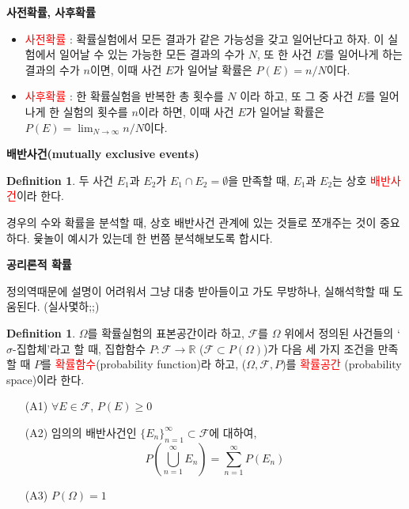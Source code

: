 \documentclass{article}
\theoremstyle{definition}
\newtheorem{definition}[theorem]{Definition}
\begin{document}
\noindent
\textbf{사전확률, 사후확률}

\begin{itemize}
    \item \textcolor{red}{사전확률} : 확률실험에서 모든 결과가 같은 가능성을 갖고 일어난다고 하자. 이 실험에서 일어날 수 있는 가능한 모든 결과의 수가 $N$, 또 한 사건 $E$를 일어나게 하는 결과의 수가 $n$이면, 이때 사건 $E$가 일어날 확률은 $P(E) = n/N$이다. 
    \item \textcolor{red}{사후확률} : 한 확률실험을 반복한 총 횟수를 $N$ 이라 하고, 또 그 중 사건 $E$를 일어나게 한 실험의 횟수를 $n$이라 하면, 이때 사건 $E$가 일어날 확률은 $P(E) = \lim_{N \rightarrow \infty} n/N$이다.
\end{itemize}

\noindent
\textbf{배반사건(mutually exclusive events)}

\begin{definition}
    두 사건 $E_1$과 $E_2$가 $E_1 \cap E_2 = \emptyset$을 만족할 때, $E_1$과 $E_2$는 상호 \textcolor{red}{배반사건}이라 한다.
\end{definition}

\noindent
경우의 수와 확률을 분석할 때, 상호 배반사건 관계에 있는 것들로 쪼개주는 것이 중요하다. 윷놀이 예시가 있는데 한 번쯤 분석해보도록 합시다.

\vspace{5mm}\noindent
\textbf{공리론적 확률}

\noindent
정의역때문에 설명이 어려워서 그냥 대충 받아들이고 가도 무방하나, 실해석학할 때 도움된다. (실사몇하;;)

\begin{definition}
    $\Omega$를 확률실험의 표본공간이라 하고, $\mathcal{F}$를 $\Omega$ 위에서 정의된 사건들의 `$\sigma$-집합체'라고 할 때, 집합함수 $P : \mathcal{F} \rightarrow \mathbb{R}$ ($\mathcal{F} \subset P(\Omega)$)가 다음 세 가지 조건을 만족할 때 $P$를 \textcolor{red}{확률함수}(probability function)라 하고, ($\Omega, \mathcal{F}, P$)를 \textcolor{red}{확률공간} (probability space)이라 한다.

    \begin{enumerate}
        \item[(A1)] $\forall E \in \mathcal{F}$, $P(E) \geq 0$
        \item[(A2)] 임의의 배반사건인 $\{E_n\}_{n=1}^\infty \subset \mathcal{F}$에 대하여,
        \begin{equation*}
            P \left( \bigcup_{n=1}^\infty E_n \right) = \sum_{n=1}^\infty P(E_n)
        \end{equation*} 
        \item[(A3)] $P(\Omega)=1$
    \end{enumerate}
\end{definition}
\end{document}
